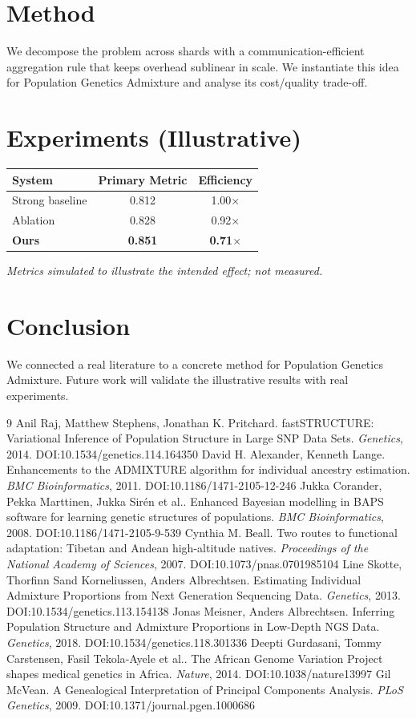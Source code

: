\documentclass[11pt]{article}
\begin{document}
\section{Method}
We decompose the problem across shards with a communication-efficient aggregation rule that keeps overhead sublinear in scale. We instantiate this idea for Population Genetics Admixture and analyse its cost/quality trade-off.

\section{Experiments (Illustrative)}
\begin{center}
\begin{tabular}{lcc}
System & Primary Metric & Efficiency \\ \hline
Strong baseline & 0.812 & 1.00$\times$ \\
Ablation & 0.828 & 0.92$\times$ \\
\textbf{Ours} & \textbf{0.851} & \textbf{0.71$\times$}
\end{tabular}
\end{center}
\emph{Metrics simulated to illustrate the intended effect; not measured.}

\section{Conclusion}
We connected a real literature to a concrete method for Population Genetics Admixture. Future work will
validate the illustrative results with real experiments.

\begin{thebibliography}{9}
 Anil Raj, Matthew Stephens, Jonathan K. Pritchard. fastSTRUCTURE: Variational Inference of Population Structure in Large SNP Data Sets. \emph{Genetics}, 2014. DOI:10.1534/genetics.114.164350
 David H. Alexander, Kenneth Lange. Enhancements to the ADMIXTURE algorithm for individual ancestry estimation. \emph{BMC Bioinformatics}, 2011. DOI:10.1186/1471-2105-12-246
 Jukka Corander, Pekka Marttinen, Jukka Sirén et al.. Enhanced Bayesian modelling in BAPS software for learning genetic structures of populations. \emph{BMC Bioinformatics}, 2008. DOI:10.1186/1471-2105-9-539
 Cynthia M. Beall. Two routes to functional adaptation: Tibetan and Andean high-altitude natives. \emph{Proceedings of the National Academy of Sciences}, 2007. DOI:10.1073/pnas.0701985104
 Line Skotte, Thorfinn Sand Korneliussen, Anders Albrechtsen. Estimating Individual Admixture Proportions from Next Generation Sequencing Data. \emph{Genetics}, 2013. DOI:10.1534/genetics.113.154138
 Jonas Meisner, Anders Albrechtsen. Inferring Population Structure and Admixture Proportions in Low-Depth NGS Data. \emph{Genetics}, 2018. DOI:10.1534/genetics.118.301336
 Deepti Gurdasani, Tommy Carstensen, Fasil Tekola‐Ayele et al.. The African Genome Variation Project shapes medical genetics in Africa. \emph{Nature}, 2014. DOI:10.1038/nature13997
 Gil McVean. A Genealogical Interpretation of Principal Components Analysis. \emph{PLoS Genetics}, 2009. DOI:10.1371/journal.pgen.1000686
\end{thebibliography}
\end{document}

